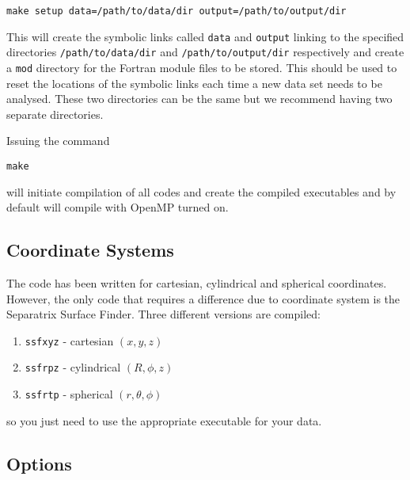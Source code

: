 \documentclass[12pt]{article}
\begin{document}
    \texttt{make setup data=/path/to/data/dir output=/path/to/output/dir}

    This will create the symbolic links called \texttt{data} and \texttt{output} linking to the specified directories \texttt{/path/to/data/dir} and \texttt{/path/to/output/dir} respectively and create a \texttt{mod} directory for the Fortran module files to be stored. This should be used to reset the locations of the symbolic links each time a new data set needs to be analysed. These two directories can be the same but we recommend having two separate directories.

    Issuing the command

    \texttt{make}

    will initiate compilation of all codes and create the compiled executables and by default will compile with OpenMP turned on.

    \subsection{Coordinate Systems}
      \label{sec:coord}

      The code has been written for cartesian, cylindrical and spherical coordinates. However, the only code that requires a difference due to coordinate system is the Separatrix Surface Finder. Three different versions are compiled:
      \begin{enumerate}
        \item \texttt{ssfxyz} - cartesian \( (x, y, z) \)
        \item \texttt{ssfrpz} - cylindrical \( (R, \phi, z) \)
        \item \texttt{ssfrtp} - spherical \( (r, \theta, \phi) \)
      \end{enumerate}
      so you just need to use the appropriate executable for your data.

    \subsection{Options}



\end{document}
